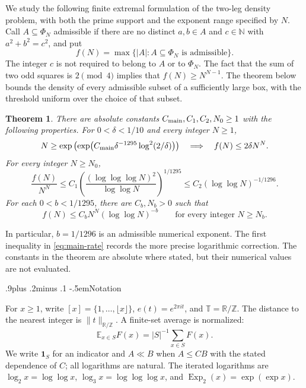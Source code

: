 \documentclass[twoside]{aomart}
\makeatletter
\theoremstyle{paperplain}
\newtheorem{theorem}{Theorem}[section]
\theoremstyle{paperdefinition}
\renewcommand\subsection{\@startsection{subsection}{2}{\z@}
  {.9\baselineskip plus .2\baselineskip minus .1\baselineskip}
  {-.5em}{\normalfont\bfseries}}
\newcommand{\E}{\mathbb E}
\newcommand{\Z}{\mathbb Z}
\newcommand{\N}{\mathbb N}
\newcommand{\R}{\mathbb R}
\newcommand{\T}{\mathbb T}
\newcommand{\Exp}{\operatorname{Exp}}
\numberwithin{equation}{section}
\makeatother
\begin{document}
We study the following finite extremal formulation of the two-leg
density problem, with both the prime support and the exponent range
specified by $N$. Call
$A\subseteq\Phi_N$ admissible if there are no distinct $a,b\in A$
and $c\in\N$ with $a^2+b^2=c^2$, and put
\begin{equation*}
 f(N)=\max\{|A|:A\subseteq\Phi_N\text{ is admissible}\}.
\end{equation*}
The integer $c$ is not required to belong to $A$ or to $\Phi_N$. The fact that the sum of two odd squares is $2\pmod 4$ implies that $f(N)\ge N^{N-1}$.
The theorem below bounds the density of every
admissible subset of a sufficiently large box, with the threshold
uniform over the choice of that subset.


\begin{theorem}
\label{thm:main}
There are absolute constants $C_{\rm main},C_1,C_2,N_0\ge1$
with the following properties. For $0<\delta<1/10$ and every integer $N\ge1$,
\begin{equation}
 N\ge\exp\left(\exp\!\left(C_{\rm main}\delta^{-1295}\log^2(2/\delta)\right)\right)
 \quad\Longrightarrow\quad f(N)\le2\delta N^N.
 \label{eq:main-threshold}
\end{equation}
For every integer $N\ge N_0$,
\begin{equation}
 \frac{f(N)}{N^N}
 \le C_1\left(\frac{(\log\log\log N)^2}{\log\log N}\right)^{1/1295}
 \le C_2(\log\log N)^{-1/1296}.
 \label{eq:main-rate}
\end{equation}
For each $0<b<1/1295$, there are $C_b,N_b>0$ such that
\begin{equation}
 f(N)\le C_b N^N(\log\log N)^{-b}
 \qquad\text{for every integer }N\ge N_b.
 \label{eq:main-other-powers}
\end{equation}
\end{theorem}


In particular, $b=1/1296$ is an admissible numerical exponent.
The first inequality in \eqref{eq:main-rate} records the more precise
logarithmic correction. The constants in the theorem are absolute
where stated, but their numerical values are not evaluated.

\subsection{Notation}
\label{intro:notation}

For $x\ge1$, write $[x]=\{1,\ldots,\lfloor x\rfloor\}$,
$e(t)=e^{2\pi it}$, and $\T=\R/\Z$.  The distance to the nearest
integer is $\|t\|_{\R/\Z}$.  A finite-set average is normalized:
\begin{equation*}
 \E_{x\in S}F(x)=|S|^{-1}\sum_{x\in S}F(x).
\end{equation*}
We write $\mathbf1_S$ for an indicator and $A\ll B$ when
$A\le CB$ with the stated dependence of $C$; all logarithms are
natural.  The iterated logarithms are
$\log_2x=\log\log x$, $\log_3x=\log\log\log x$, and
$\Exp_2(x)=\exp(\exp x)$.
\end{document}
